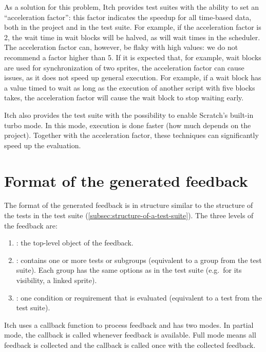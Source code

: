 \documentclass[../main]{subfiles}
\begin{document}
As a solution for this problem, Itch provides test suites with the ability to set an ``acceleration factor'': this factor indicates the speedup for all time-based data, both in the project and in the test suite.
For example, if the acceleration factor is 2, the wait time in wait blocks will be halved, as will wait times in the scheduler.
The acceleration factor can, however, be flaky with high values: we do not recommend a factor higher than 5.
If it is expected that, for example, wait blocks are used for synchronization of two sprites, the acceleration factor can cause issues, as it does not speed up general execution.
For example, if a wait block has a value timed to wait as long as the execution of another script with five blocks takes, the acceleration factor will cause the wait block to stop waiting early.

Itch also provides the test suite with the possibility to enable Scratch's built-in turbo mode.
In this mode, execution is done faster (how much depends on the project).
Together with the acceleration factor, these techniques can significantly speed up the evaluation.

\section{Format of the generated feedback}\label{sec:format-of-the-generated-feedback}

The format of the generated feedback is in structure similar to the structure of the tests in the test suite (\cref{subsec:structure-of-a-test-suite}).
The three levels of the feedback are:

\begin{enumerate}
    \item {}: the top-level object of the feedback.
    \item {}: contains one or more tests or subgroups (equivalent to a group from the test suite).
        Each group has the same options as in the test suite (e.g.\ for its visibility, a linked sprite).
    \item {}: one condition or requirement that is evaluated (equivalent to a test from the test suite).
\end{enumerate}

Itch uses a callback function to process feedback and has two modes.
In partial mode, the callback is called whenever feedback is available.
Full mode means all feedback is collected and the callback is called once with the collected feedback.
\end{document}
